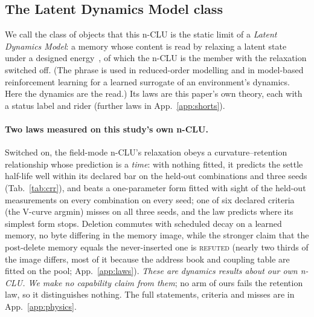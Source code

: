 \documentclass{article} %
\begin{document}
\subsection{The Latent Dynamics Model class}
\label{sec:theory}

We call the class of objects that this n-CLU is the static limit of a \emph{Latent Dynamics
Model}: a memory whose content is read by relaxing a latent state under a designed energy~\citep{hopfield_neural_1982,krotov_dense_2016,ramsauer_hopfield_2021,hoover_energy_2023,kong_reservoir-computing_2024}, of
which the n-CLU is the member with the relaxation switched off. (The phrase is used in
reduced-order modelling and in model-based reinforcement learning for a learned surrogate of an
environment's dynamics. Here the dynamics are the read.) Its laws are this paper's own theory, each with a status label and rider (further laws in App.~\ref{app:shorts}).

\paragraph{Two laws measured on this study's own n-CLU.}
Switched on, the field-mode n-CLU's relaxation obeys a curvature--retention relationship whose
prediction is a \emph{time}: with nothing fitted, it predicts the settle half-life
well within its declared bar on the held-out combinations and three seeds (Tab.~\ref{tab:crr}), and beats a one-parameter form fitted with sight of the held-out measurements
on every combination on every seed; one of six declared criteria (the V-curve argmin) misses on
all three seeds, and the law predicts where its simplest form stops.
Deletion commutes with scheduled decay on a learned memory, no byte differing in the memory
image, while the stronger claim that the post-delete memory equals the never-inserted one is
\textsc{refuted} (nearly two thirds of the image differs, most of it because the address book
and coupling table are fitted on the pool; App.~\ref{app:laws}). %
\emph{These are dynamics results about our own n-CLU. We make no capability claim from them}; no arm of ours fails the retention law,
so it distinguishes nothing. The full statements, criteria and misses are in
App.~\ref{app:physics}.
\end{document}
